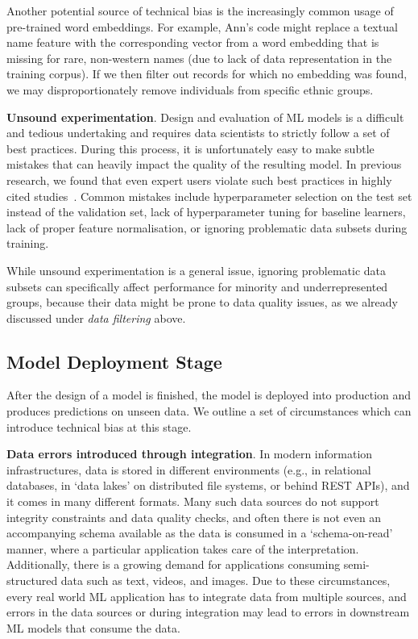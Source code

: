 \documentclass[11pt]{article}
\newcommand*{\eg}{e.g.,\xspace}
\newcommand{\header}[1]{\vspace{1mm}\noindent\textbf{#1}.}
\begin{document}
Another potential source of technical bias is the increasingly common usage of pre-trained word embeddings. For example, Ann's code might replace a textual name feature with the corresponding vector from a word embedding that is missing for rare, non-western names (due to lack of data representation in the training corpus). If we then filter out records for which no embedding was found, we may disproportionately remove individuals from specific ethnic groups.  

\header{Unsound experimentation} 
Design and evaluation of ML models is a difficult and tedious undertaking and requires data scientists to strictly follow a set of best practices. During this process, it is unfortunately easy to make subtle mistakes that can heavily impact the quality of the resulting model. In previous research, we found that even expert users violate such best practices in highly cited studies~\cite{DBLP:conf/edbt/SchelterHKS20}. Common mistakes include hyperparameter selection on the test set instead of the validation set, lack of hyperparameter tuning for baseline learners, lack of proper feature normalisation, or ignoring problematic data subsets during training.  

While unsound experimentation is a general issue,  ignoring problematic data subsets can specifically affect performance for minority and underrepresented groups, because their data might be prone to data quality issues, as we already discussed under \emph{data filtering} above.

\subsection{Model Deployment Stage}
\label{sec:bias-deployment}

After the design of a model is finished, the model is deployed into production and produces predictions on unseen data. We outline a set of circumstances which can introduce technical bias at this stage.

\header{Data errors introduced through integration} In modern information infrastructures, data is stored in different  environments (\eg in relational databases, in ‘data lakes’ on distributed file systems, or behind REST APIs), and it comes in many different formats. Many such data sources do not support integrity constraints and data quality checks, and often there is not even an accompanying schema available as the data is consumed in a ‘schema-on-read’ manner, where a particular application takes care of the interpretation. Additionally, there is a growing demand for applications consuming semi-structured data such as text, videos, and images.  Due to these circumstances, every real world ML application has to integrate data from multiple sources, and errors in the data sources or during  integration may lead to errors in downstream ML models that consume the data. 
\end{document}
